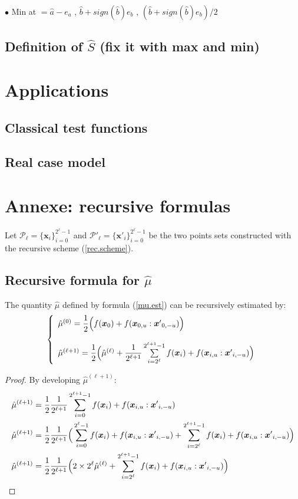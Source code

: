 \documentclass[]{elsarticle}
\theoremstyle{definition}
\newcommand{\bvec}[1]{\boldsymbol{#1}}
\newcommand{\vx}{\bvec{x}}
\begin{document}
$\bullet$ Min at $= \hat{a} - e_a$  ,  $\hat{b} + sign(\hat{b}) e_b$  ,  $(\hat{b} + sign(\hat{b}) e_b)/2$
\subsection{Definition of $\widehat{S}$ (fix it with max and min)}


\section{Applications}
\subsection{Classical test functions}
\subsection{Real case model}


\newpage
\section{Annexe: recursive formulas}

Let $\mathcal{P}_\ell=\{\vx_i\}_{i=0}^{2^\ell-1}$ and $\mathcal{P}'_\ell=\{{\vx'}_i\}_{i=0}^{2^\ell-1}$ be the two points sets constructed with the recursive scheme (\ref{rec.scheme}).  

\subsection{Recursive formula for $\hat{\mu}$}

The quantity $\hat{\mu}$ defined by formula (\ref{mu.est}) can be recursively estimated by:
\[\left \lbrace\begin{array}{l}
\hat{\mu}^{(0)} = \dfrac{1}{2} \Big{(} f(\vx_0)+f(\vx_{0,u}:{\vx'}_{0,-u}) \Big{)} \\
\\
\hat{\mu}^{(\ell+1)} = \dfrac{1}{2} \Big{(} \hat{\mu}^{(\ell)} + \dfrac{1}{2^{\ell+1}} \sum \limits_{i=2^{\ell}}^{2^{\ell+1}-1} f(\vx_i) + f(\vx_{i,u}:{\vx'}_{i,-u}) \Big{)}
\end{array}\right.\]
\begin{proof}
By developing $\hat{\mu}^{(\ell+1)}$:
\begin{align*}
\hat{\mu}^{(\ell+1)} &= \dfrac{1}{2} \dfrac{1}{2^{\ell+1}} \sum \limits_{i=0}^{2^{\ell+1}-1} f(\vx_i) + f(\vx_{i,u}:{\vx'}_{i,-u}) \\
\hat{\mu}^{(\ell+1)} &= \dfrac{1}{2} \dfrac{1}{2^{\ell+1}} \Big{(} \sum \limits_{i=0}^{2^{\ell}-1} f(\vx_i) + f(\vx_{i,u}:{\vx'}_{i,-u}) + \sum \limits_{i=2^{\ell}}^{2^{\ell+1}-1} f(\vx_i) + f(\vx_{i,u}:{\vx'}_{i,-u}) \Big{)}\\
\hat{\mu}^{(\ell+1)} &= \dfrac{1}{2} \dfrac{1}{2^{\ell+1}} \Big{(} 2 \times 2^{\ell}\hat{\mu}^{(\ell)} + \sum \limits_{i=2^{\ell}}^{2^{\ell+1}-1} f(\vx_i) + f(\vx_{i,u}:{\vx'}_{i,-u}) \Big{)}\\
\end{align*}
\end{proof}
\end{document}
